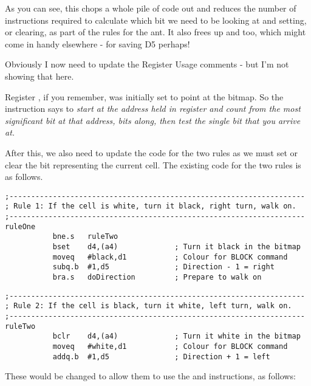 As you can see, this chops a whole pile of code out and reduces the number of instructions required to calculate which bit we need to be looking at and setting, or clearing, as part of the rules for the ant. It also frees up  and  too, which might come in handy elsewhere - for saving D5 perhaps!

Obviously I now need to update the Register Usage comments - but I'm not showing that here.

Register , if you remember, was initially set to point at the  bitmap. So the  instruction says to \emph{start at the address held in register  and count from the most significant bit at that address,  bits along, then test the single bit that you arrive at.}

After  this, we also need to update the code for the two rules as we must set or clear the bit representing the current cell. The existing code for the two rules is as follows.



\begin{lstlisting}[firstnumber=293,caption={Langtons Ant - Existing Rule 1}]
;--------------------------------------------------------------------
; Rule 1: If the cell is white, turn it black, right turn, walk on.
;--------------------------------------------------------------------
ruleOne
           bne.s   ruleTwo
           bset    d4,(a4)             ; Turn it black in the bitmap
           moveq   #black,d1           ; Colour for BLOCK command
           subq.b  #1,d5               ; Direction - 1 = right
           bra.s   doDirection         ; Prepare to walk on

\end{lstlisting}



\begin{lstlisting}[firstnumber=303,caption={Langtons Ant - Existing Rule 2}]
;--------------------------------------------------------------------
; Rule 2: If the cell is black, turn it white, left turn, walk on.
;--------------------------------------------------------------------
ruleTwo
           bclr    d4,(a4)             ; Turn it white in the bitmap
           moveq   #white,d1           ; Colour for BLOCK command
           addq.b  #1,d5               ; Direction + 1 = left
\end{lstlisting}

These would be changed to allow them to use the  and  instructions, as follows:

